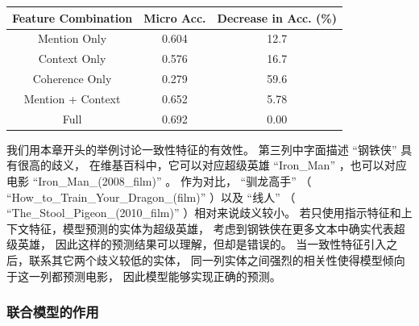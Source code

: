 \begin{table}[ht]
	\centering
	\label{tab:tabel-ablation-features}
	\begin{tabular} {c|c|c}
        \hline
		Feature Combination &   Micro Acc.  & Decrease in Acc. (\%) \\
		\hline
		Mention Only           &   0.604    & 12.7 \\
		Context Only        &   0.576    & 16.7   \\
		Coherence Only      &   0.279    & 59.6     \\
		Mention + Context      &   0.652    & 5.78    \\
		\hline
		Full                &   0.692    & 0.00  \\
        \hline
	\end{tabular}
\end{table}

我们用本章开头的举例讨论一致性特征的有效性。
第三列中字面描述 ``{钢铁侠}'' 具有很高的歧义，
在维基百科中，它可以对应超级英雄 ``Iron\_Man'' ，也可以对应电影 ``Iron\_Man\_(2008\_film)'' 。
作为对比， ``{驯龙高手}'' （ ``How\_to\_Train\_Your\_Dragon\_(film)'' ）以及
``{线人}''  （ ``The\_Stool\_Pigeon\_(2010\_film)'' ）相对来说歧义较小。
若只使用指示特征和上下文特征，模型预测的实体为超级英雄，
考虑到钢铁侠在更多文本中确实代表超级英雄，
因此这样的预测结果可以理解，但却是错误的。
当一致性特征引入之后，联系其它两个歧义较低的实体，
同一列实体之间强烈的相关性使得模型倾向于这一列都预测电影，
因此模型能够实现正确的预测。




\subsubsection{联合模型的作用}

